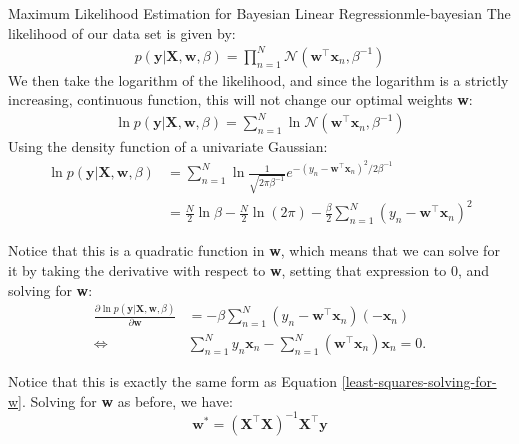 \begin{derivation}{Maximum Likelihood Estimation for Bayesian Linear Regression}{mle-bayesian}
    The likelihood of our data set is given by:
    \begin{align*}
        p(\textbf{y} | \textbf{X}, \textbf{w}, \beta) = \prod_{n=1}^{N} \mathcal{N}(\textbf{w}^\top\textbf{x}_{n}, \beta^{-1})
    \end{align*}
    We then take the logarithm of the likelihood, and since the logarithm is a strictly increasing, continuous function, this will not change our optimal weights \textbf{w}:
    \begin{align*}
        \ln{p(\textbf{y} | \textbf{X}, \textbf{w}, \beta)} = \sum_{n=1}^{N} \ln{\mathcal{N}(\textbf{w}^\top\textbf{x}_{n}, \beta^{-1})}
    \end{align*}
    Using the density function of a univariate Gaussian:
    \begin{align*}
        \ln{p(\textbf{y} | \textbf{X}, \textbf{w}, \beta)} &= \sum_{n=1}^{N} \ln{\frac{1}{\sqrt{2\pi\beta^{-1}}} e^{-(y_{n} - \textbf{w}^\top\textbf{x}_{n})^2 / 2\beta^{-1}}} \\
        &= \frac{N}{2}\ln{\beta} - \frac{N}{2}\ln{(2\pi)} - \frac{\beta}{2} \sum_{n=1}^{N} (y_{n} - \textbf{w}^\top\textbf{x}_{n})^2
    \end{align*}

    Notice that this is a quadratic function in \textbf{w}, which means that we can solve for it by taking the derivative with respect to \textbf{w}, setting that expression to 0, and solving for \textbf{w}:
    \begin{align*}
      \frac{\partial \ln{p(\textbf{y} | \textbf{X}, \textbf{w}, \beta)}}{\partial \textbf{w}} & = -  \beta \sum_{n=1}^{N} (y_{n} - \textbf{w}^\top\textbf{x}_{n})(-\textbf{x}_{n})
      \\
      \Leftrightarrow \quad & 
      \sum_{n=1}^{N} y_{n} \textbf{x}_{n} - \sum_{n=1}^N (\textbf{w}^\top\textbf{x}_n)\textbf{x}_n=0.
    \end{align*}

    Notice that this is exactly the same form as Equation \ref{least-squares-solving-for-w}. Solving for \textbf{w} as before, we have:
    \begin{equation} \label{bayesian-solved-for-w}
        \textbf{w}^{*} = (\textbf{X}^\top\textbf{X})^{-1}\textbf{X}^\top\textbf{y}
    \end{equation}
\end{derivation}

